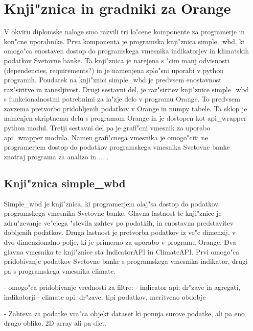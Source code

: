 \chapter{Knji"znica in gradniki za Orange}

V okviru diplomske naloge smo razvili tri lo"cene komponente za programerje in
kon"cne uporabnike. Prva komponenta je programska knji"znica simple\_wbd, ki
omogo"ca enostaven dostop do programskega vmesnika indikatorjev in klimatskih
podatkov Svetovne banke. Ta knji"znica je narejena s "cim manj odvisnosti
(dependencies, requirements?) in je namenjena splo"sni uporabi v python
programih. Poudarek na knji"znici simple\_wbd je predvsem enostavnost 
raz"siritve in zanesljivost. Drugi sestavni del, je raz"siritev knji"znice
simple\_wbd s funkcionalnostmi potrebnimi za la"zje delo v programu Orange.
To predvsem zavzema pretvorbo pridobljenih podatkov v Orange in numpy tabele.
Ta sklop je namenjen skriptnemu delu s programom Orange in je dostopen kot
api\_wrapper python modul. Tretji sestavni del pa je grafi"cni vmesnik za
uporabo api\_wrapper modula. Namen grafi"cnega vmesnika je omogo"citi ne
programerjem dostop do podatkov programskega vmesnika Svetovne banke znotraj
programa za analizo in ... .

\section{Knji"znica simple\_wbd}

Simple\_wbd je knji"znica, ki programerjem olaj"sa dostop do podatkov
programskega vmesnika Svetovne banke. Glavna lastnost te knji"znice je
zdru"zevanje ve"cjega "stevila zahtev po podatkih, in enostavna predstavitev
dobljenih podatkov. Druga lastnost je pretvorba podatkov iz ve"c dimenzij, v
dvo-dimenzionalno polje, ki je primerno za uporabo v programu Orange. Dva
glavna vmesnika te knji"znice sta IndicatorAPI in ClimateAPI. Prvi omogo"ca
pridobivanje podatkov Svetovne banke s programskega vmesnika indikator, drugi
pa s programskega vmesnika climate.




% 

- omogo"ca pridobivanje vrednosti za filtre:
    - indicator api: dr"zave in agregati, indikatorji
    - climate api: dr"zave, tipi podatkov, meritveno obdobje 

- Zahteva za podatke vra"ca objekt dataset ki ponuja surove podatke, ali pa eno
  drugo obliko. 2D array ali pa dict.

